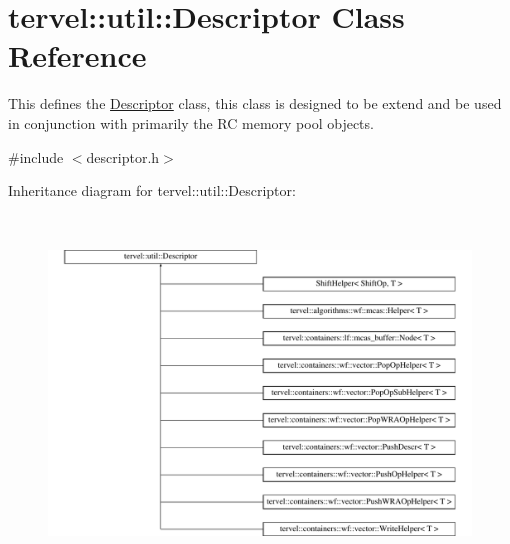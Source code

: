 \hypertarget{classtervel_1_1util_1_1_descriptor}{}\section{tervel\+:\+:util\+:\+:Descriptor Class Reference}
\label{classtervel_1_1util_1_1_descriptor}


This defines the \hyperlink{classtervel_1_1util_1_1_descriptor}{Descriptor} class, this class is designed to be extend and be used in conjunction with primarily the R\+C memory pool objects.  




{\ttfamily \#include $<$descriptor.\+h$>$}

Inheritance diagram for tervel\+:\+:util\+:\+:Descriptor\+:\begin{figure}[H]
\begin{center}
\leavevmode
\includegraphics[height=9.447853cm]{classtervel_1_1util_1_1_descriptor}
\end{center}
\end{figure}
